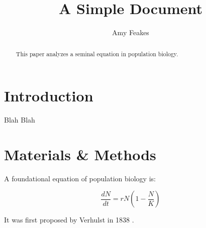 \documentclass [12pt]{article}
\title{A Simple Document}
\author{Amy Feakes}
\begin{document}
    \maketitle

    \begin{abstract}
        This paper analyzes a seminal equation in population biology.
    \end{abstract}

    \section{Introduction}
        Blah Blah
    \section{Materials \& Methods}

    A foundational equation of population biology is:

    \begin{equation}
        \frac{dN}{dt} = r N (1 - \frac{N}{K} )
    \end{equation}

    It was first proposed by Verhulst in 1838 \cite{verhulst1838notice}.

    

    
\end{document}
